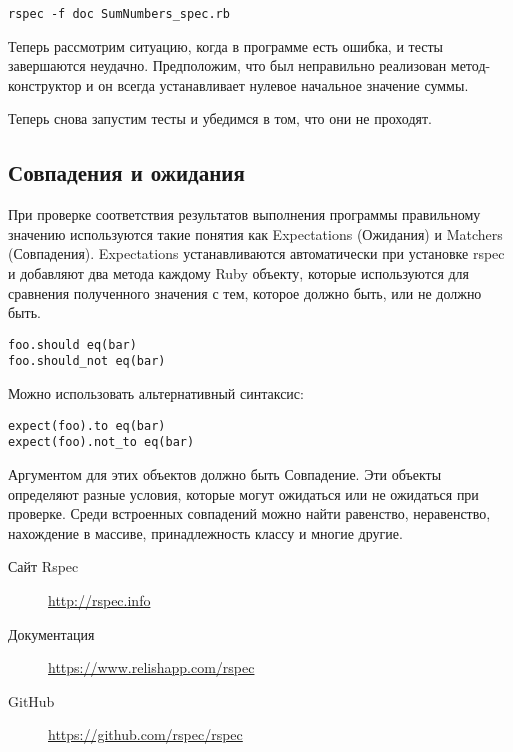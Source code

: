 \begin{verbatim}
rspec -f doc SumNumbers_spec.rb
\end{verbatim}



Теперь рассмотрим ситуацию, когда в программе есть ошибка, и тесты завершаются неудачно. Предположим, что был неправильно реализован метод-конструктор и он всегда устанавливает нулевое начальное значение суммы.



Теперь снова запустим тесты и убедимся в том, что они не проходят.



\subsection{Совпадения и ожидания}

При проверке соответствия результатов выполнения программы правильному значению используются такие понятия как Expectations (Ожидания) и Matchers (Совпадения). Expectations устанавливаются автоматически при установке rspec и добавляют два метода каждому Ruby объекту, которые используются для сравнения полученного значения с тем, которое должно быть, или не должно быть.

\begin{verbatim}
foo.should eq(bar)
foo.should_not eq(bar)
\end{verbatim}

Можно использовать альтернативный синтаксис:

\begin{verbatim}
expect(foo).to eq(bar)
expect(foo).not_to eq(bar) 
\end{verbatim}

Аргументом для этих объектов должно быть Совпадение. Эти объекты определяют разные условия, которые могут ожидаться или не ожидаться при проверке. Среди встроенных совпадений можно найти равенство, неравенство, нахождение в массиве, принадлежность классу и многие другие.

\begin{description}
\item[Сайт Rspec] \url{http://rspec.info}
\item[Документация] \url{https://www.relishapp.com/rspec}
\item[GitHub] \url{https://github.com/rspec/rspec}
\end{description}

